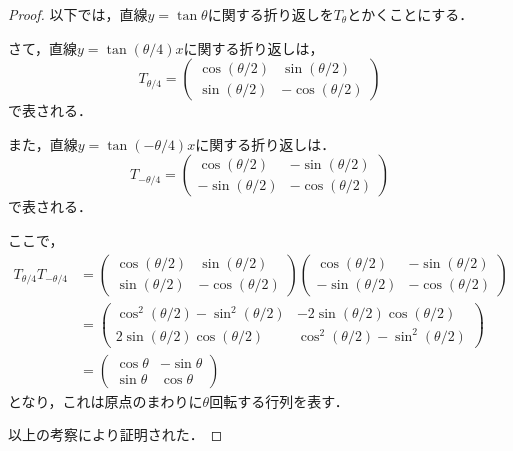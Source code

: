 \documentclass[a4paper,10pt,fleqn]{ltjsarticle}
\begin{document}
\begin{tleftbar}
    \begin{proof}
        以下では，直線$y= \tan \theta$に関する折り返しを$T_{\theta}$とかくことにする．

        さて，直線$ y = \tan (\theta /4) x$に関する折り返しは，
        \[
            T_{\theta/4} = \begin{pmatrix} \cos (\theta /2) & \sin (\theta /2) \\  \sin (\theta /2) & -\cos (\theta /2) \end{pmatrix}
        \]
        で表される．

        また，直線$y = \tan (-\theta /4)x$に関する折り返しは．
        \[
            T_{-\theta/4} = \begin{pmatrix} \cos (\theta /2) & -\sin (\theta/2) \\ -\sin (\theta/2) & -\cos (\theta /2) \end{pmatrix}
        \]
        で表される．

        ここで，
        \begin{align*}
            T_{\theta/4} T_{-\theta/4} & = \begin{pmatrix} \cos (\theta /2) & \sin (\theta /2) \\  \sin (\theta /2) & -\cos (\theta /2) \end{pmatrix} \begin{pmatrix} \cos (\theta /2) & -\sin (\theta/2) \\ -\sin (\theta/2) & -\cos (\theta /2) \end{pmatrix} \\
                                       & =\begin{pmatrix} \cos ^2 (\theta /2)-\sin ^2 (\theta/2) & -2\sin (\theta/2) \cos (\theta/2) \\ 2\sin (\theta/2) \cos (\theta/2) & \cos ^2 (\theta/2)-\sin ^2 (\theta/2) \end{pmatrix}                                  \\
                                       & = \begin{pmatrix} \cos \theta & -\sin \theta \\ \sin \theta & \cos \theta \end{pmatrix}
        \end{align*}
        となり，これは原点のまわりに$\theta$回転する行列を表す．

        以上の考察により証明された．
    \end{proof}
\end{tleftbar}
\end{document}
